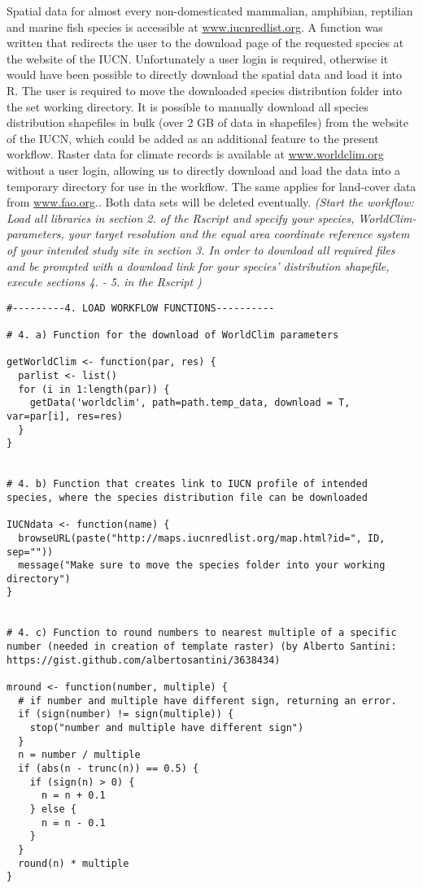 \documentclass[11pt, a4paper]{article}\usepackage[]{graphicx}\usepackage[]{color}
\begin{document}
Spatial data for almost every non-domesticated mammalian, amphibian, reptilian and marine fish species is accessible at \url{www.iucnredlist.org}. A function was written that redirects the user to the download page of the requested species at the website of the IUCN. Unfortunately a user login is required, otherwise it would have been possible to directly download the spatial data and load it into R. The user is required to move the downloaded species distribution folder into the set working directory. It is possible to manually download all species distribution shapefiles in bulk (over 2 GB of data in shapefiles) from the website of the IUCN, which could be added as an additional feature to the present workflow. Raster data for climate records is available at \url{www.worldclim.org} without a user login, allowing us to directly download and load the data into a temporary directory for use in the workflow. The same applies for land-cover data from \url{www.fao.org}.\newline. Both data sets will be deleted eventually. \textit{(Start the workflow: Load all libraries in section 2. of the Rscript and specify your species, WorldClim-parameters, your target resolution and the equal area coordinate reference system of your intended study site in section 3. In order to download all required files and be prompted with a download link for your species' distribution shapefile, execute sections 4. - 5. in the Rscript )}

\begin{verbatim}
#---------4. LOAD WORKFLOW FUNCTIONS----------

# 4. a) Function for the download of WorldClim parameters

getWorldClim <- function(par, res) {
  parlist <- list()
  for (i in 1:length(par)) {
    getData('worldclim', path=path.temp_data, download = T, var=par[i], res=res)
  }
}


# 4. b) Function that creates link to IUCN profile of intended species, where the species distribution file can be downloaded

IUCNdata <- function(name) {
  browseURL(paste("http://maps.iucnredlist.org/map.html?id=", ID, sep=""))
  message("Make sure to move the species folder into your working directory")
}


# 4. c) Function to round numbers to nearest multiple of a specific number (needed in creation of template raster) (by Alberto Santini: https://gist.github.com/albertosantini/3638434)

mround <- function(number, multiple) {
  # if number and multiple have different sign, returning an error.
  if (sign(number) != sign(multiple)) {
    stop("number and multiple have different sign")
  }
  n = number / multiple
  if (abs(n - trunc(n)) == 0.5) {
    if (sign(n) > 0) {
      n = n + 0.1
    } else {
      n = n - 0.1
    }
  }
  round(n) * multiple
}

\end{verbatim}
\end{document}
